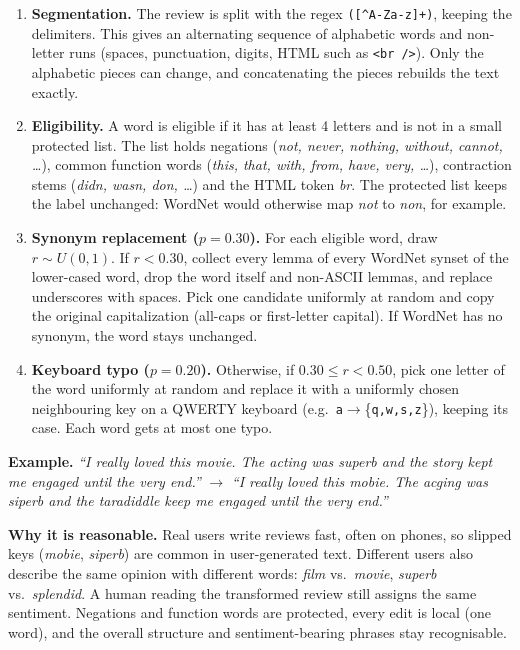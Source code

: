 \documentclass[11pt]{article}
\begin{document}
\begin{enumerate}[leftmargin=*]
  \item \textbf{Segmentation.} The review is split with the regex \verb/([^A-Za-z]+)/, keeping the delimiters. This gives an
  alternating sequence of alphabetic words and non-letter runs (spaces, punctuation, digits, HTML such as
  \texttt{<br />}). Only the alphabetic pieces can change, and concatenating the pieces rebuilds the text exactly.
  \item \textbf{Eligibility.} A word is eligible if it has at least 4 letters and is not in a small protected list.
  The list holds negations (\emph{not, never, nothing, without, cannot, \ldots}), common function words
  (\emph{this, that, with, from, have, very, \ldots}), contraction stems (\emph{didn, wasn, don, \ldots}) and the HTML token
  \emph{br}. The protected list keeps the label unchanged: WordNet would otherwise map \emph{not} to \emph{non}, for example.
  \item \textbf{Synonym replacement ($p=0.30$).} For each eligible word, draw $r\sim U(0,1)$. If $r<0.30$, collect
  every lemma of every WordNet synset of the lower-cased word, drop the word itself and non-ASCII lemmas, and replace
  underscores with spaces. Pick one candidate uniformly at random and copy the original capitalization
  (all-caps or first-letter capital). If WordNet has no synonym, the word stays unchanged.
  \item \textbf{Keyboard typo ($p=0.20$).} Otherwise, if $0.30\le r<0.50$, pick one letter of the word uniformly at
  random and replace it with a uniformly chosen neighbouring key on a QWERTY keyboard
  (e.g.\ \texttt{a}$\to$\{\texttt{q,w,s,z}\}), keeping its case. Each word gets at most one typo.
\end{enumerate}

\noindent\textbf{Example.} \emph{``I really loved this movie. The acting was superb and the story kept me engaged
until the very end.''} $\to$ \emph{``I really loved this mobie. The acging was siperb and the taradiddle keep me
engaged until the very end.''}

\noindent\textbf{Why it is reasonable.} Real users write reviews fast, often on phones, so slipped keys
(\emph{mobie}, \emph{siperb}) are common in user-generated text. Different users also describe the same opinion
with different words: \emph{film} vs.\ \emph{movie}, \emph{superb} vs.\ \emph{splendid}. A human reading the
transformed review still assigns the same sentiment. Negations and function words are protected, every edit is local
(one word), and the overall structure and sentiment-bearing phrases stay recognisable.
\end{document}
